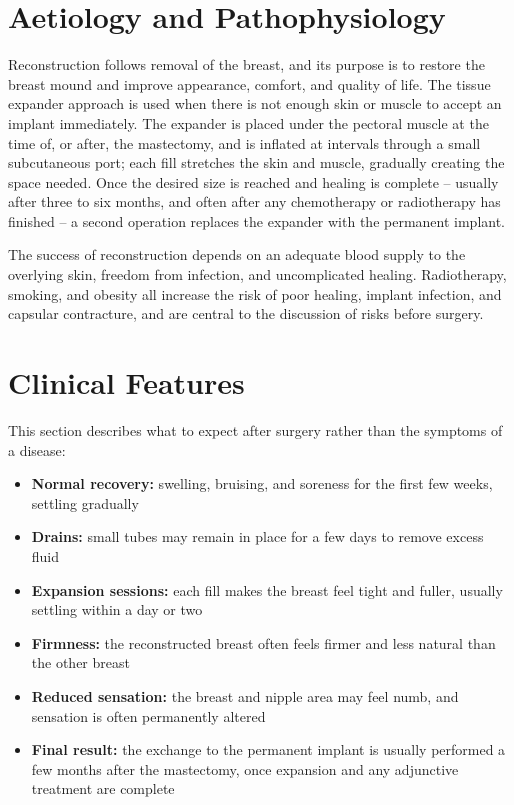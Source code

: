 \section*{Aetiology and Pathophysiology}
Reconstruction follows removal of the breast, and its purpose is to restore the breast mound and improve appearance, comfort, and quality of life. The tissue expander approach is used when there is not enough skin or muscle to accept an implant immediately. The expander is placed under the pectoral muscle at the time of, or after, the mastectomy, and is inflated at intervals through a small subcutaneous port; each fill stretches the skin and muscle, gradually creating the space needed. Once the desired size is reached and healing is complete -- usually after three to six months, and often after any chemotherapy or radiotherapy has finished -- a second operation replaces the expander with the permanent implant.

The success of reconstruction depends on an adequate blood supply to the overlying skin, freedom from infection, and uncomplicated healing. Radiotherapy, smoking, and obesity all increase the risk of poor healing, implant infection, and capsular contracture, and are central to the discussion of risks before surgery.

\section*{Clinical Features}
This section describes what to expect after surgery rather than the symptoms of a disease:

\begin{itemize}
    \item \textbf{Normal recovery:} swelling, bruising, and soreness for the first few weeks, settling gradually
    \item \textbf{Drains:} small tubes may remain in place for a few days to remove excess fluid
    \item \textbf{Expansion sessions:} each fill makes the breast feel tight and fuller, usually settling within a day or two
    \item \textbf{Firmness:} the reconstructed breast often feels firmer and less natural than the other breast
    \item \textbf{Reduced sensation:} the breast and nipple area may feel numb, and sensation is often permanently altered
    \item \textbf{Final result:} the exchange to the permanent implant is usually performed a few months after the mastectomy, once expansion and any adjunctive treatment are complete
\end{itemize}

